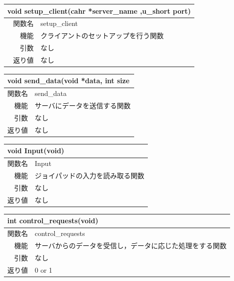 \documentclass{jarticle}
\begin{document}
\begin{table}[H]
\begin{tabular}{|r|l|}
\hline
\multicolumn{2}{|l|}{void setup\_client(cahr *server\_name ,u\_short port)}       \\ \hline
関数名           & setup\_client \\ \hline
機能     & クライアントのセットアップを行う関数 \\
引数     & なし \\
返り値   & なし \\ \hline
\end{tabular}
\end{table}

\begin{table}[H]
\begin{tabular}{|r|l|}
\hline
  \multicolumn{2}{|l|}{void send\_data(void *data, int size}       \\ \hline
関数名           & send\_data \\ \hline
機能     & サーバにデータを送信する関数 \\
引数     & なし \\
返り値   & なし \\ \hline
\end{tabular}
\end{table}



\begin{table}[H]
\begin{tabular}{|r|l|}
\hline
\multicolumn{2}{|l|}{void Input(void)}  \\ \hline
関数名           & Input \\ \hline
機能     & ジョイパッドの入力を読み取る関数 \\
引数     & なし \\
返り値   & なし \\ \hline
\end{tabular}
\end{table}

\begin{table}[H]
\begin{tabular}{|r|l|}
\hline
\multicolumn{2}{|l|}{int control\_requests(void)}       \\ \hline
関数名           & control\_requests \\ \hline
機能     & サーバからのデータを受信し，データに応じた処理をする関数 \\
引数     & なし \\
返り値   & 0 or 1 \\ \hline
\end{tabular}
\end{table}
\end{document}
